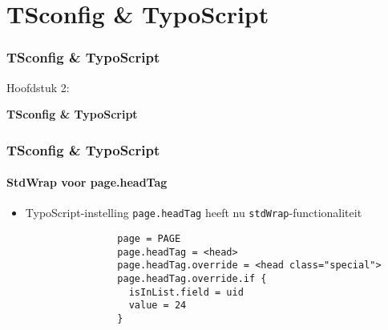 %

\section{TSconfig \& TypoScript}
\begin{frame}[fragile]
	\frametitle{TSconfig \& TypoScript}

	\begin{center}\huge{Hoofdstuk 2:}\end{center}
	\begin{center}\huge{\color{typo3darkgrey}\textbf{TSconfig \& TypoScript}}\end{center}

\end{frame}


\begin{frame}[fragile]
	\frametitle{TSconfig \& TypoScript}
	\framesubtitle{StdWrap voor page.headTag}

	\begin{itemize}
		\item TypoScript-instelling \texttt{page.headTag} heeft nu \texttt{stdWrap}-functionaliteit

			\begin{lstlisting}
				page = PAGE
				page.headTag = <head>
				page.headTag.override = <head class="special">
				page.headTag.override.if {
		  		  isInList.field = uid
		  		  value = 24
				}
			\end{lstlisting}	

	\end{itemize}

\end{frame}

